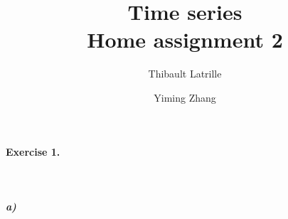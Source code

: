 \documentclass{article}
\author{Thibault Latrille \and Yiming Zhang}
\title{Time series
 \\ Home assignment 2}
\begin{document}
\maketitle

\paragraph{Exercise 1.}
\
\subparagraph{a)}
\end{document}
